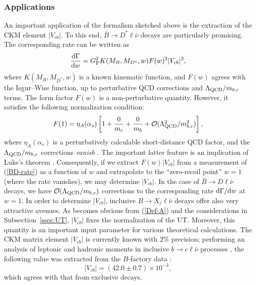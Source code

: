 \documentclass[12pt]{article}
\begin{document}
%
%
%
\subsubsection{Applications}
%
%
%
An important application of the formalism sketched above is the
extraction of the CKM element $|V_{cb}|$. To this end, 
$\bar B\to D^*\ell\bar \nu$ decays are particularly promising. 
The corresponding rate can be written as 
\begin{equation}\label{BD-rate}
\frac{{\rm d}\Gamma}{{\rm d}w}=G_{\rm F}^2 K(M_B,M_{D^\ast},w) 
F(w)^2 |V_{cb}|^2,
\end{equation}
where $K(M_B,M_{D^\ast},w)$ is a known kinematic function, and 
$F(w)$ agrees with the Isgur--Wise function, up to perturbative
QCD corrections and $\Lambda_{\rm QCD}/m_{b,c}$ terms. The form 
factor $F(w)$ is a non-perturbative quantity. However, it satisfies 
the following normalization condition:
\begin{equation}\label{F1-norm}
F(1)=\eta_A(\alpha_s)\left[1+\frac{0}{m_c}+
\frac{0}{m_b}+
{\cal O}(\Lambda_{\rm QCD}^2/m_{b,c}^2)\right],
\end{equation} 
where $\eta_A(\alpha_s)$ is a perturbatively calculable short-distance
QCD factor, and the $\Lambda_{\rm QCD}/m_{b,c}$ corrections {\it vanish}
\cite{neubert-rev,neu-BDast}. The important latter feature is an 
implication of Luke's theorem \cite{luke}. Consequently, 
if we extract $F(w)|V_{cb}|$ from a measurement of (\ref{BD-rate}) 
as a function of $w$ and extrapolate to the ``zero-recoil point'' $w=1$
(where the rate vanishes), we may determine $|V_{cb}|$. In the case of 
$\bar B\to D\ell\bar \nu$ decays, we have 
${\cal O}(\Lambda_{\rm QCD}/m_{b,c})$ corrections to the 
corresponding rate ${\rm d}\Gamma/{\rm d}w$ at $w=1$. 
In order to determine $|V_{cb}|$, inclusive $B\to X_c\ell\bar \nu$ decays 
offer also very attractive avenues. As becomes obvious from (\ref{Def-A})
and the considerations in Subsection~\ref{ssec:UT}, $|V_{cb}|$ fixes 
the normalization of the UT. Moreover, this quantity is an important 
input parameter for various theoretical calculations. The CKM matrix
element $|V_{cb}|$ is currently known with $2\%$ precision;  performing an analysis
of leptonic and hadronic moments in inclusive $b\to c \ell \bar \nu$ processes 
\cite{Gambino}, the following value was extracted from the $B$-factory 
data \cite{OBuchmuller}:
\begin{equation}\label{Vcb}
|V_{cb}| = (42.0\pm 0.7)\times 10^{-3},
\end{equation}
which agrees with that from exclusive decays. 
\end{document}
